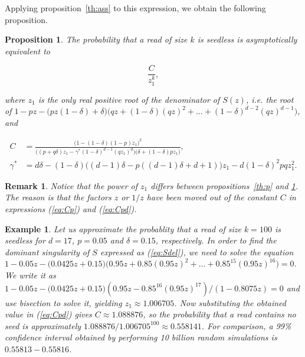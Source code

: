 \documentclass{article}
\newtheorem{example}{Example}
\newtheorem{proposition}{Proposition}
\newtheorem{remark}{Remark}
\begin{document}
Applying proposition~\ref{th:ass} to this expression, we obtain the
following proposition.

\begin{proposition}
\label{th:pd}
The probability that a read of size $k$ is seedless is asymptotically
equivalent to

\begin{equation*}
\frac{C}{z_1^k},
\end{equation*}

\noindent
where $z_1$ is the only real positive root of the denominator of $S(z)$,
\textit{i.e.} the root of $1-pz - \big(pz(1-\delta) +
\delta\big)\big(qz+(1-\delta)(qz)^2 + \ldots +
(1-\delta)^{d-2}(qz)^{d-1}\big)$, and

\begin{equation}
\label{eq:Cpd}
\begin{split}
C &=
\frac{ \big(1-(1-\delta)(1-p)z_1\big)^2 }
{ \big((p+q\delta)z_1  -\gamma^*(1-\delta)^{d-1}(qz_1)^d \big)
\big(\delta+(1-\delta)pz_1\big) }, \\
\gamma^* &= d\delta -(1-\delta)\big((d-1)\delta-p((d-1)\delta+d+1)\big)z_1
- d(1-\delta)^2pqz_1^2.
\end{split}
\end{equation}
\end{proposition}

\begin{remark}
Notice that the power of $z_1$ differs between propositions~\ref{th:p} and
\ref{th:pd}. The reason is that the factors $z$ or $1/z$ have been moved
out of the constant $C$ in expressions (\ref{eq:Cp}) and (\ref{eq:Cpd}).
\end{remark}

\begin{example}
\label{ex:num2}
Let us approximate the probablity that a read of size $k = 100$ is
seedless for $d=17$, $p = 0.05$ and $\delta = 0.15$, respectively.
In order to find the dominant singularity of $S$ expressed as
(\ref{eq:Sdel}), we need to solve the equation $1-0.05z - \big(0.0425z +
0.15\big) \big(0.95z+0.85(0.95z)^2 + \ldots + 0.85^{15}(0.95z)^{16}\big) =
0$. We write it as $1-0.05z - \big(0.0425z + 0.15)
(0.95z-0.85^{16}(0.95z)^{17}) / (1-0.8075z) = 0$ and use bisection to
solve it, yielding $z_1 \approx 1.006705$. Now substituting the obtained
value in (\ref{eq:Cpd}) gives $C \approx 1.088876$, so the probability
that a read contains no seed is approximately $1.088876 / 1.006705^{100}
\approx 0.558141$. For comparison, a 99\% confidence interval obtained by
performing 10 billion random simulations is $0.55813-0.55816$.
\end{example}
\end{document}
